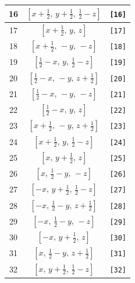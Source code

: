 \documentclass[fleqn,8pt]{jsarticle}
\begin{document}
\begin{longtable}{ccc}
16 & $\left[ x + \frac{1}{2},\, y + \frac{1}{2},\, \frac{1}{2} - z \right]$ & {\tt [16]} \\ \hline
17 & $\left[ x + \frac{1}{2},\, y,\, z \right]$ & {\tt [17]} \\ \hline
18 & $\left[ x + \frac{1}{2},\, - y,\, - z \right]$ & {\tt [18]} \\ \hline
19 & $\left[ \frac{1}{2} - x,\, y,\, \frac{1}{2} - z \right]$ & {\tt [19]} \\ \hline
20 & $\left[ \frac{1}{2} - x,\, - y,\, z + \frac{1}{2} \right]$ & {\tt [20]} \\ \hline
21 & $\left[ \frac{1}{2} - x,\, - y,\, - z \right]$ & {\tt [21]} \\ \hline
22 & $\left[ \frac{1}{2} - x,\, y,\, z \right]$ & {\tt [22]} \\ \hline
23 & $\left[ x + \frac{1}{2},\, - y,\, z + \frac{1}{2} \right]$ & {\tt [23]} \\ \hline
24 & $\left[ x + \frac{1}{2},\, y,\, \frac{1}{2} - z \right]$ & {\tt [24]} \\ \hline
25 & $\left[ x,\, y + \frac{1}{2},\, z \right]$ & {\tt [25]} \\ \hline
26 & $\left[ x,\, \frac{1}{2} - y,\, - z \right]$ & {\tt [26]} \\ \hline
27 & $\left[ - x,\, y + \frac{1}{2},\, \frac{1}{2} - z \right]$ & {\tt [27]} \\ \hline
28 & $\left[ - x,\, \frac{1}{2} - y,\, z + \frac{1}{2} \right]$ & {\tt [28]} \\ \hline
29 & $\left[ - x,\, \frac{1}{2} - y,\, - z \right]$ & {\tt [29]} \\ \hline
30 & $\left[ - x,\, y + \frac{1}{2},\, z \right]$ & {\tt [30]} \\ \hline
31 & $\left[ x,\, \frac{1}{2} - y,\, z + \frac{1}{2} \right]$ & {\tt [31]} \\ \hline
32 & $\left[ x,\, y + \frac{1}{2},\, \frac{1}{2} - z \right]$ & {\tt [32]} \\
\end{longtable}
\end{document}
